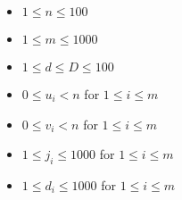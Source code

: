 \begin{itemize}
	\tightlist
	\item $1\le n \le 100$
	\item $1\le m \le 1000$
	\item $1 \le d \le D \le 100$
	\item $0 \le u_i < n$ for $1\le i\le m$
	\item $0 \le v_i < n$ for $1\le i\le m$
	\item $1 \le j_i \le 1000$ for $1\le i\le m$
	\item $1 \le d_i \le 1000$ for $1\le i\le m$
\end{itemize}
\newpage
